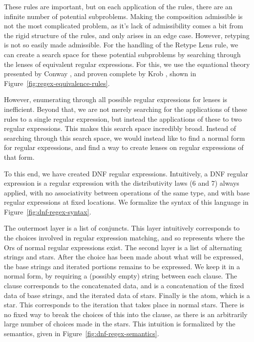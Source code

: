 
These rules are important, but on each application of the rules, there are an
infinite number of potential subproblems.
Making the composition admissible is not the most complicated problem,
as it's lack of admissibility comes a bit from the rigid structure of the rules,
and only arises in an edge case.
However, retyping is not so easily made admissible.
For the handling of the Retype Lens
rule, we can create a search space for these potential subproblems by
searching through the lenses of equivalent regular expressions.
For this, we use the equational theory presented by Conway \cite{conway},
and proven complete by Krob \cite{Krob},
shown in Figure~\ref{fig:regex-equivalence-rules}.

However, enumerating through all possible regular expressions for lenses is inefficient.
Beyond that, we are not merely searching for the applications of these rules to
a single regular expression, but instead the applications of these to two regular expressions.
This makes this search space incredibly broad.
Instead of searching through this search space, we would instead like to find
a normal form for regular expressions, and find a way to create lenses on
regular expressions of that form.



To this end, we have created DNF regular expressions.  Intuitively, a DNF regular
expression is a regular expression with the distributivity laws (6 and 7) always
applied, with no associativity between operations of the same type,
and with base regular expressions at fixed locations.
We formalize the syntax of this language in Figure~\ref{fig:dnf-regex-syntax}.

The outermost layer is a list of conjuncts.
This layer intuitively corresponds to the choices involved in regular expression matching, and so represents where the Ors of normal regular expressions exist.
The second layer is a list of alternating strings and stars.
After the choice has been made about what will be expressed,
the base strings and iterated portions remains to be expressed.
We keep it in a normal form, by requiring a (possibly empty) string between
each clause.
The clause corresponds to the concatenated data, and is a concatenation of the
fixed data of base strings, and the iterated data of stars.
Finally is the atom, which is a star.
This corresponds to the iteration that takes place in normal stars.
There is no fixed way to break the choices of this into the clause,
as there is an arbitrarily large number of choices made in the stars.
This intuition is formalized by the semantics, given in Figure~\ref{fig:dnf-regex-semantics}.

